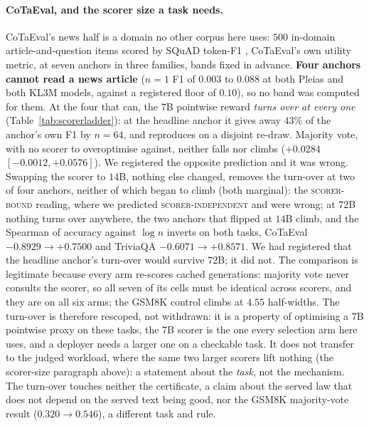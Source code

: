 \paragraph{CoTaEval, and the scorer size a task needs.}
CoTaEval's news half \citep{wei2024cotaeval} is a domain no other corpus here uses: $500$ in-domain
article-and-question items scored by SQuAD token-F1 \citep{rajpurkar2016squad}, CoTaEval's own utility
metric, at seven anchors in three families, bands fixed in advance. \textbf{Four anchors cannot read a
news article} ($n=1$ F1 of $0.003$ to $0.088$ at both Pleias and both KL3M models, against a registered
floor of $0.10$), so no band was computed for them. At the four that can, the $7$B pointwise reward
\emph{turns over at every one} (Table~\ref{tab:scorerladder}): at the headline anchor it gives away $43\%$
of the anchor's own F1 by $n=64$, and reproduces on a disjoint re-draw. Majority vote, with no scorer to
overoptimise against, neither falls nor climbs ($+0.0284$ $[-0.0012,+0.0576]$). We registered the opposite
prediction and it was wrong. Swapping the scorer to $14$B, nothing else changed, removes the turn-over at two of four anchors, neither of which began to climb (both marginal):
the \textsc{scorer-bound} reading, where we predicted \textsc{scorer-independent} and were wrong; at $72$B
nothing turns over anywhere, the two anchors that flipped at $14$B climb, and the Spearman of accuracy
against $\log n$ inverts on both tasks, CoTaEval $-0.8929 \to +0.7500$ and TriviaQA $-0.6071 \to +0.8571$.
We had registered that the headline anchor's turn-over would survive $72$B; it did not. The comparison is
legitimate because every arm re-scores cached generations: majority vote never consults the scorer, so all
seven of its cells must be identical across scorers, and they are on all six arms; the GSM8K control
climbs at $4.55$ half-widths. The turn-over is therefore rescoped, not withdrawn: it is a property of
optimising a $7$B pointwise proxy on these tasks, the $7$B scorer is the one every selection arm here
uses, and a deployer needs a larger one on a checkable task. It does not transfer to the judged
workload, where the same two larger scorers lift nothing (the scorer-size paragraph above): a statement about the \emph{task}, not the mechanism. The turn-over touches neither the certificate, a claim about the served law that does not depend on the served text being good, nor the GSM8K majority-vote result ($0.320 \to 0.546$), a different task and rule.

